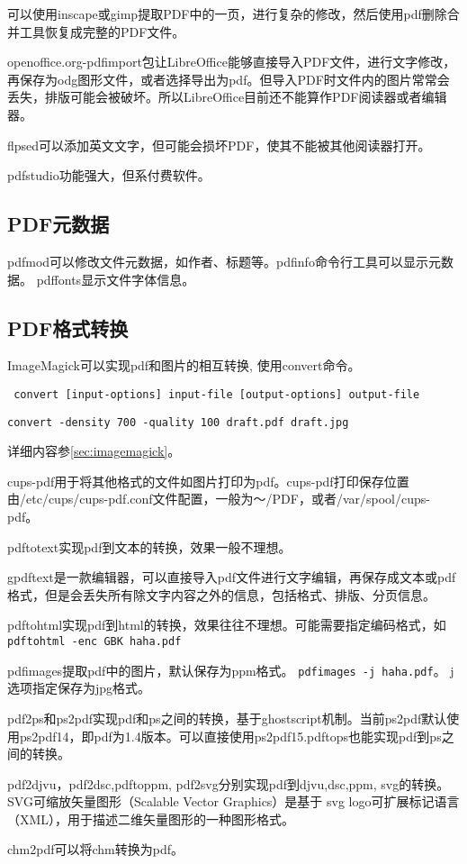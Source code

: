 可以使用inscape或gimp提取PDF中的一页，进行复杂的修改，然后使用pdf删除合并工具恢复成完整的PDF文件。

openoffice.org-pdfimport包让LibreOffice能够直接导入PDF文件，进行文字修改，再保存为odg图形文件，或者选择导出为pdf。但导入PDF时文件内的图片常常会丢失，排版可能会被破坏。所以LibreOffice目前还不能算作PDF阅读器或者编辑器。

flpsed可以添加英文文字，但可能会损坏PDF，使其不能被其他阅读器打开。

pdfstudio功能强大，但系付费软件。

\subsection{PDF元数据}
pdfmod可以修改文件元数据，如作者、标题等。pdfinfo命令行工具可以显示元数据。
pdffonts显示文件字体信息。

\subsection{PDF格式转换}
ImageMagick可以实现pdf和图片的相互转换, 使用convert命令。
\begin{verbatim}
 convert [input-options] input-file [output-options] output-file
\end{verbatim}

\begin{verbatim}
convert -density 700 -quality 100 draft.pdf draft.jpg
\end{verbatim}
详细内容参\ref{sec:imagemagick}。

cups-pdf用于将其他格式的文件如图片打印为pdf。cups-pdf打印保存位置由/etc/cups/cups-pdf.conf文件配置，一般为～/PDF，或者/var/spool/cups-pdf。

pdftotext实现pdf到文本的转换，效果一般不理想。

gpdftext是一款编辑器，可以直接导入pdf文件进行文字编辑，再保存成文本或pdf格式，但是会丢失所有除文字内容之外的信息，包括格式、排版、分页信息。

pdftohtml实现pdf到html的转换，效果往往不理想。可能需要指定编码格式，如
\verb+pdftohtml -enc GBK haha.pdf +

pdfimages提取pdf中的图片，默认保存为ppm格式。
\verb+pdfimages -j haha.pdf+。
j选项指定保存为jpg格式。

pdf2ps和ps2pdf实现pdf和ps之间的转换，基于ghostscript机制。当前ps2pdf默认使用ps2pdf14，即pdf为1.4版本。可以直接使用ps2pdf15.pdftops也能实现pdf到ps之间的转换。

pdf2djvu，pdf2dsc,pdftoppm, pdf2svg分别实现pdf到djvu,dsc,ppm, svg的转换。SVG可缩放矢量图形（Scalable Vector Graphics）是基于  svg logo可扩展标记语言（XML），用于描述二维矢量图形的一种图形格式。

chm2pdf可以将chm转换为pdf。




